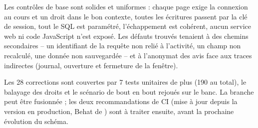 \documentclass[11pt,a4paper]{article}
\newcommand{\code}[1]{\texttt{\detokenize{#1}}}
\begin{document}
Les contrôles de base sont solides et uniformes : chaque page exige la connexion au cours et un
droit dans le bon contexte, toutes les écritures passent par la clé de session, tout le SQL est
paramétré, l'échappement est cohérent, aucun service web ni code JavaScript n'est exposé. Les
défauts trouvés tenaient à des chemins secondaires -- un identifiant de la requête non relié à
l'activité, un champ non recalculé, une donnée non sauvegardée -- et à l'anonymat des avis face
aux traces indirectes (journal, ouverture et fermeture de la fenêtre).

Les 28 corrections sont couvertes par 7 tests unitaires de plus (190 au total), le balayage
des droits et le scénario de bout en bout rejoués sur le banc. La branche peut être fusionnée ;
les deux recommandations de CI (mise à jour depuis la version en production, Behat de
\code{mod_ep}) sont à traiter ensuite, avant la prochaine évolution du schéma.
\end{document}
